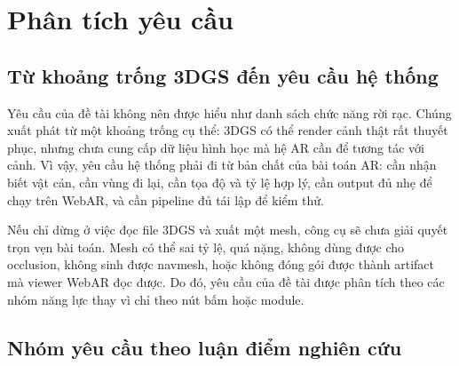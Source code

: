 \section{Phân tích yêu cầu}

\subsection{Từ khoảng trống 3DGS đến yêu cầu hệ thống}

Yêu cầu của đề tài không nên được hiểu như danh sách chức năng rời rạc. Chúng xuất phát từ một khoảng trống cụ thể: 3DGS có thể render cảnh thật rất thuyết phục, nhưng chưa cung cấp dữ liệu hình học mà hệ AR cần để tương tác với cảnh. Vì vậy, yêu cầu hệ thống phải đi từ bản chất của bài toán AR: cần nhận biết vật cản, cần vùng đi lại, cần tọa độ và tỷ lệ hợp lý, cần output đủ nhẹ để chạy trên WebAR, và cần pipeline đủ tái lập để kiểm thử.

Nếu chỉ dừng ở việc đọc file 3DGS và xuất một mesh, công cụ sẽ chưa giải quyết trọn vẹn bài toán. Mesh có thể sai tỷ lệ, quá nặng, không dùng được cho occlusion, không sinh được navmesh, hoặc không đóng gói được thành artifact mà viewer WebAR đọc được. Do đó, yêu cầu của đề tài được phân tích theo các nhóm năng lực thay vì chỉ theo nút bấm hoặc module.

\subsection{Nhóm yêu cầu theo luận điểm nghiên cứu}

